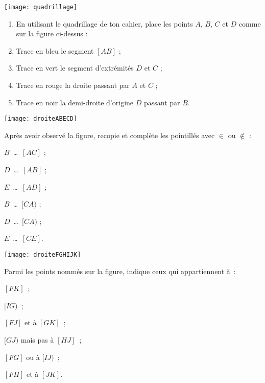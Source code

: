 

\begin{exercice}
 \begin{center} \texttt{[image: quadrillage]} \end{center}
 \begin{enumerate}
  \item En utilisant le quadrillage de ton cahier, place les points $A$, $B$, $C$ et $D$ comme sur la figure ci-dessus :
  \item Trace en bleu le segment $[AB]$ ;
  \item Trace en vert le segment d'extrémités $D$ et $C$ ;
  \item Trace en rouge la droite passant par $A$ et $C$ ;
  \item Trace en noir la demi-droite d'origine $D$ passant par $B$.
  \end{enumerate}
 \end{exercice}


\begin{exercice}
 \begin{center} \texttt{[image: droiteABECD]} \end{center}
 Après avoir observé la figure, recopie et complète les pointillés avec $\in$ ou $\notin$ :
    \begin{colenumerate}{3}
     \item $B$ \ldots $[AC]$ ;
     \item $D$ \ldots $[AB]$ ;
     \item $E$ \ldots $[AD]$ ;
     \item $B$ \ldots $[CA)$ ;
     \item $D$ \ldots $[CA)$ ;
     \item $E$ \ldots $[CE]$.
     \end{colenumerate}
\end{exercice}


\begin{exercice}[À trouver]
 \begin{center} \texttt{[image: droiteFGHIJK]}  \end{center}
 Parmi les points nommés sur la figure, indique ceux qui appartiennent à :
    \begin{colenumerate}{2}
     \item $[FK]$ ;
     \item $[IG)$ ;
     \item $[FJ]$ et à $[GK]$ ;
     \item $[GJ)$ mais pas à $[HJ]$ ;
     \item $[FG]$ ou à $[IJ)$ ;
     \item $[FH]$ et à $[JK]$.
     \end{colenumerate}
\end{exercice}



